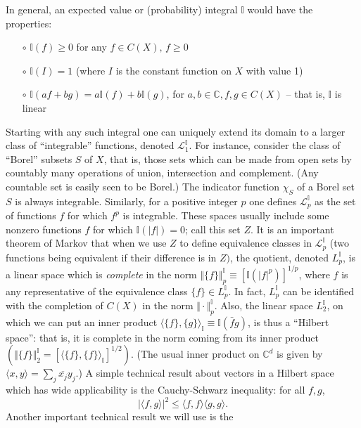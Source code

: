 \documentclass[reqno]{stml-l}
\theoremstyle{plain}
\theoremstyle{definition}
\numberwithin{equation}{chapter}
\begin{document}
In general, an expected value or (probability) integral $\mathbb{I}$ would have the properties:
\begin{enumerate}
\item[$\circ$] $\mathbb{I}(f)\geq 0$ for any $f\in C(X),\,f\geq 0$
\item[$\circ$] $\mathbb{I}(I)=1$ (where $I$ is the constant function on $X$ with value 1)
\item[$\circ$] $\mathbb{I}(af+bg)=a\mathbb{I}(f)+b\mathbb{I}(g)$, for $a,b\in \mathbb{C},f,g\in C(X)$ -- that is, $\mathbb{I}$ is linear
\end{enumerate}
Starting with any such integral one can uniquely extend its domain to a larger class of ``integrable'' functions, denoted $\mathcal{L}_{1}^{\mathbb{I}}$. For instance, consider the class of ``Borel'' subsets $S$ of $X$, that is, those sets which can be made from open sets by countably many operations of union, intersection and complement. (Any countable set is easily seen to be Borel.) The indicator function $\chi_{S}$ of a Borel set $S$ is always integrable. Similarly, for a positive integer $p$ one defines $\mathcal{L}_{p}^{\mathbb{I}}$ as the set of functions $f$ for which $f^{p}$ is integrable. These spaces usually include some nonzero functions $f$ for which $\mathbb{I}(|f|)=0$; call this set $Z$. It is an important theorem of Markov that when we use $Z$ to define equivalence classes in $\mathcal{L}_{p}^{\mathbb{I}}$ (two functions being equivalent if their difference is in $Z)$, the quotient, denoted $L_{p}^{\mathbb{I}}$, is a linear space which is \emph{complete} in the norm $\Vert\{f\}\Vert_{p}^{\mathbb{I}}\equiv[\mathbb{I}(|f|^{p})]^{1/p}$, where $f$ is any representative of the equivalence class $\{f\}\in L_{p}^{\mathbb{I}}$. In fact, $L_{p}^{\mathbb{I}}$ can be identified with the completion of $C(X)$ in the norm $\Vert\cdot\Vert_{p}^{\mathbb{I}}$. Also, the linear space $L_{2}^{\mathbb{I}}$, on which we can put an inner product $\langle\{f\},\{g\}\rangle_{\mathbb{I}}\equiv \mathbb{I}(\bar{f}g)$, is thus a ``Hilbert space'': that is, it is complete in the norm coming from its inner product $(\Vert\{f\}\Vert_{2}^{\mathbb{I}}=[\langle\{f\}, \{f\}\rangle_{\mathbb{I}}]^{1/2})$. (The usual inner product on $\mathbb{C}^{d}$ is given by $\langle x,y\rangle=\sum\nolimits_{j}\overline{x_{j}}y_{j}$.) A simple technical result about vectors in a Hilbert space which has wide applicability is the Cauchy-Schwarz inequality: for all $f,g$,
\begin{equation}\label{appIII:eqn1}
|\langle f,g\rangle|^{2}\leq\langle f,f\rangle\langle g, g\rangle.
\end{equation}
Another important technical result we will use is the
\end{document}
